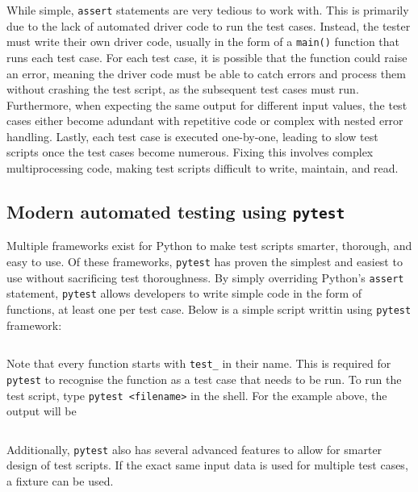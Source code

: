 \documentclass[11pt]{article}
\begin{document}
While simple, \texttt{assert} statements are very tedious to work with. This is primarily due to the lack of automated driver code to run the test cases. Instead, the tester must write their own driver code, usually in the form of a \texttt{main()} function that runs each test case. For each test case, it is possible that the function could raise an error, meaning the driver code must be able to catch errors and process them without crashing the test script, as the subsequent test cases must run. Furthermore, when expecting the same output for different input values, the test cases either become adundant with repetitive code or complex with nested error handling. Lastly, each test case is executed one-by-one, leading to slow test scripts once the test cases become numerous. Fixing this involves complex multiprocessing code, making test scripts difficult to write, maintain, and read.

\subsection{Modern automated testing using \texttt{pytest}}

Multiple frameworks exist for Python to make test scripts smarter, thorough, and easy to use. Of these frameworks, \texttt{pytest} has proven the simplest and easiest to use without sacrificing test thoroughness. By simply overriding Python's \texttt{assert} statement, \texttt{pytest} allows developers to write simple code in the form of functions, at least one per test case. Below is a simple script writtin using \texttt{pytest} framework:

\inputminted{python}{python_examples/pytest_simple.py}

\noindent
Note that every function starts with \texttt{test_} in their name. This is required for \texttt{pytest} to recognise the function as a test case that needs to be run. To run the test script, type \texttt{pytest <filename>} in the shell. For the example above, the output will be 

\inputminted[linenos=false, frame=none]{shell}{python_examples/pytest_simple_output.txt}

Additionally, \texttt{pytest} also has several advanced features to allow for smarter design of test scripts. If the exact same input data is used for multiple test cases, a fixture can be used.

\inputminted{python}{python_examples/pytest_fixture.py}
\end{document}
